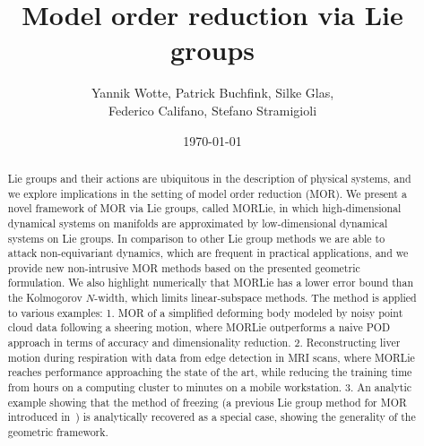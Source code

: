 \documentclass{article}
\title{Model order reduction via Lie groups}
\author{Yannik Wotte, Patrick Buchfink, Silke Glas, \\ Federico Califano, Stefano Stramigioli}
\date{\today}
\newcommand{\yannik}[1]{\textcolor{blue}{\textbf{YW}:~#1}}
\newcommand{\federico}[1]{\textcolor{BrickRed}{\textbf{FC}:~#1}}
\newcommand{\stefano}[1]{{\color{red}\textbf{SS}:~#1}}
\newcommand{\silke}[1]{\textcolor{purple}{\textbf{SG}:~#1}}
\newcommand{\patrick}[1]{\textcolor{teal}{\textbf{PB}:~#1}}
\begin{document}
\maketitle

 
    
\begin{abstract}
    Lie groups and their actions are ubiquitous in the description of physical systems, and we explore implications in the setting of model order reduction (MOR).
    We present a novel framework of MOR via Lie groups, called MORLie, in which high-dimensional dynamical systems on manifolds are approximated by low-dimensional dynamical systems on Lie groups.  
    In comparison to other Lie group methods we are able to attack non-equivariant dynamics, which are frequent in practical applications, and we provide new non-intrusive MOR methods based on the presented geometric formulation.
    We also highlight numerically that MORLie has a lower error bound than the Kolmogorov $N$-width, which limits linear-subspace methods.  
    The method is applied to various examples: 1. MOR of a simplified deforming body modeled by noisy point cloud data following a sheering motion, where MORLie outperforms a naive POD approach in terms of accuracy and dimensionality reduction. 2. Reconstructing liver motion during respiration with data from edge detection in MRI scans, where MORLie reaches performance approaching the state of the art, while reducing the training time from hours on a computing cluster to minutes on a mobile workstation. 3. An analytic example showing that the method of freezing (a previous Lie group method for MOR introduced in~\cite{Ohlberger2013}) is analytically recovered as a special case, showing the generality of the geometric framework.    
\end{abstract}
\end{document}
